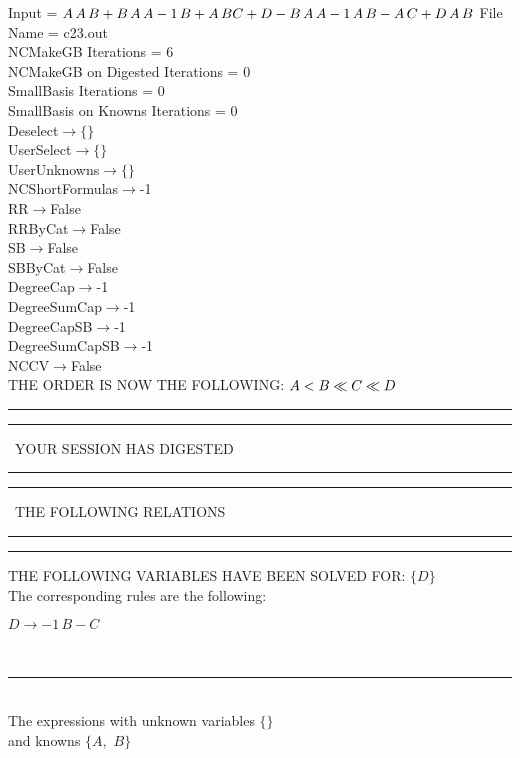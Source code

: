 \documentclass[rep10,leqno]{report}
\begin{document}
\normalsize
\baselineskip=12pt
\noindent
Input = 
$
\\A\,
 A\,
 B + B\,
 A\,
 A\\
-1\,
 B + A\,
 B\\
C + D - B\,
 A\,
 A\\
-1\,
 A\,
 B - A\,
 C + D\,
 A\,
 B\\
$
File Name = c23.out\\
NCMakeGB Iterations = 6\\
NCMakeGB on Digested Iterations = 0\\
SmallBasis Iterations = 0\\
SmallBasis on Knowns Iterations = 0\\
Deselect$\rightarrow \{\}$\\
UserSelect$\rightarrow \{\}$\\
UserUnknowns$\rightarrow \{\}$\\
NCShortFormulas$\rightarrow$-1\\
RR$\rightarrow $False\\
RRByCat$\rightarrow $False\\
SB$\rightarrow $False\\
SBByCat$\rightarrow $False\\
DegreeCap$\rightarrow $-1\\
DegreeSumCap$\rightarrow $-1\\
DegreeCapSB$\rightarrow $-1\\
DegreeSumCapSB$\rightarrow $-1\\
NCCV$\rightarrow $False\\
THE ORDER IS NOW THE FOLLOWING:\hfil\break
$
A<B\ll
C\ll
D\\
$
\rule[2pt]{6in}{4pt}\hfil\break
\rule[2pt]{1.879in}{4pt}
\ YOUR SESSION HAS DIGESTED\ 
\rule[2pt]{1.879in}{4pt}\hfil\break
\rule[2pt]{1.923in}{4pt}
\ THE FOLLOWING RELATIONS\ 
\rule[2pt]{1.923in}{4pt}\hfil\break
\rule[2pt]{6in}{4pt}\hfil\break
THE FOLLOWING VARIABLES HAVE BEEN SOLVED FOR:\hfil\break
$\{D\}$
\smallskip\\
The corresponding rules are the following:\smallskip\\
\begin{minipage}{6in}
$
D\rightarrow -1\,
 B - C
$
\end{minipage}\medskip\\
\rule[3pt]{6in}{.7pt}\\
The expressions with unknown variables $\{\}$\\
and knowns $\{A,
$ $
B\}$\smallskip\\
\end{document}
